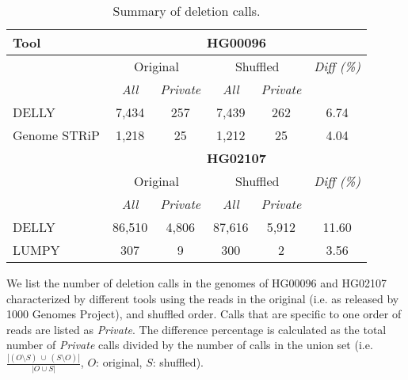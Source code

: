 \documentclass[10pt,a4paper]{article}
\begin{document}
\begin{table}[htb]
\caption{Summary of deletion calls.}
\begin{center}
\begin{tabular}{|l|c|c||c|c||c|}
\hline
{\bf Tool} & \multicolumn{5}{|c|}{\bf HG00096} \\
\hline
{\bf } & \multicolumn{2}{c||}{Original} & \multicolumn{2}{c||}{Shuffled} & {\it Diff (\%) } \\
\cline{2-6}
{\bf } & {\it All } & {\it Private } & {\it All } & {\it Private } & {\it }\\
\hline
DELLY & 7,434 & 257 & 7,439 & 262 & 6.74 \\
Genome STRiP & 1,218 & 25 & 1,212 & 25 & 4.04 \\
\hline
\hline
{\bf } & \multicolumn{5}{|c|}{\bf HG02107} \\
\hline
{\bf } & \multicolumn{2}{c||}{Original} & \multicolumn{2}{c||}{Shuffled} & {\it Diff (\%) } \\
\cline{2-6}
{\bf } & {\it All } & {\it Private } & {\it All } & {\it Private } & {\it }\\
\hline
DELLY & 86,510 & 4,806 & 87,616 & 5,912 & 11.60 \\
LUMPY & 307 & 9 & 300 & 2 & 3.56 \\
\hline
\end{tabular}
\end{center}
{\footnotesize  We list the number of deletion calls in the genomes of HG00096 and HG02107 characterized by different tools using the reads in the original (i.e. as released by 1000 Genomes Project), and shuffled order.
  Calls that are specific to one order of reads are listed as {\it Private}. The difference percentage is calculated as the total number of {\it Private} calls divided by the number of calls in the union set  (i.e. $\frac{|(O\setminus S)~\cup~ (S\setminus O)|}{|O\cup S|}$, $O$: original, $S$: shuffled). }
\label{tab:dels-orig-vs-shuf}
\end{table}
\end{document}
